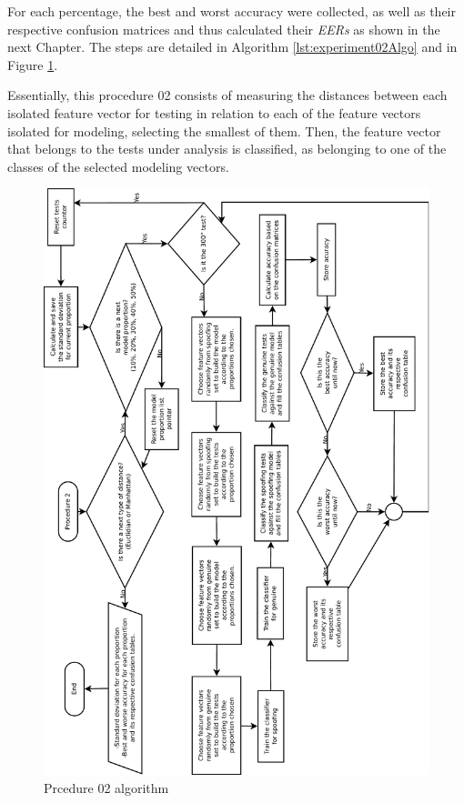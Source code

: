 			\par For each percentage, the best and worst accuracy were collected, as well as their respective confusion matrices and thus calculated their \textit{EERs} as shown in the next Chapter. The steps are detailed in Algorithm \ref{lst:experiment02Algo} and in Figure \ref{fig:experiment02Algo}.
	
			\par Essentially, this procedure 02 consists of measuring the distances between each isolated feature vector for testing in relation to each of the feature vectors isolated for modeling, selecting the smallest of them. Then, the feature vector that belongs to the tests under analysis is classified, as belonging to one of the classes of the selected modeling vectors.   
			
			\begin{figure}[H]
				\centering
				\includegraphics[width=.83\linewidth]{images/AlgoProcedure02}
				\caption{Prcedure 02 algorithm}
				\label{fig:experiment02Algo}
			\end{figure}
			
